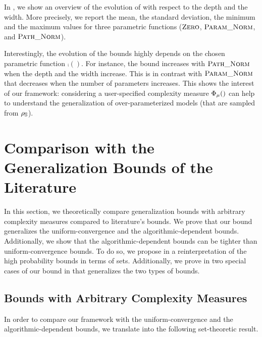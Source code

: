 In , we show an overview of the evolution of  with respect to the depth and the width.
More precisely, we report the mean, the standard deviation, the minimum and the maximum values for three parametric functions ($\text{\sc Zero}$, $\text{\sc Param\_Norm}$, and $\text{\sc Path\_Norm}$).

Interestingly, the evolution of the bounds highly depends on the chosen parametric function $\comp()$. 
For instance, the bound increases with $\text{\sc Path\_Norm}$ when the depth and the width increase.
This is in contrast with $\text{\sc Param\_Norm}$ that decreases when the number of parameters increases.
This shows the interest of our framework: considering a user-specified complexity measure $\Phi_{\operatorname{\mu}}()$ can help to understand the generalization of over-parameterized models (that are sampled from $\rho_{\mathbb{S}}$).

\section{Comparison with the Generalization Bounds of the Literature}
\label{chap:dis-mu:sec:comparison}

In this section, we theoretically compare generalization bounds with arbitrary complexity measures compared to literature's bounds. 
We prove that our bound generalizes the uniform-convergence and the algorithmic-dependent bounds.
Additionally, we show that the algorithmic-dependent bounds can be tighter than uniform-convergence bounds.
To do so, we propose in  a reinterpretation of the high probability bounds in terms of sets.
Additionally, we prove in  two special cases of our bound in  that generalizes the two types of bounds.

\subsection{Bounds with Arbitrary Complexity Measures}

In order to compare our framework with the uniform-convergence and the algorithmic-dependent bounds, we translate  into the following set-theoretic result.

